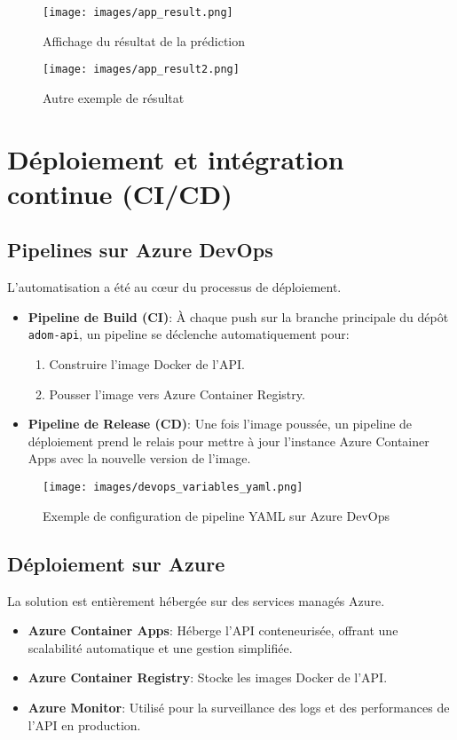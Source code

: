 \documentclass[12pt,a4paper]{report}
\begin{document}
\begin{figure}[H]
    \centering
    \begin{minipage}{0.45\textwidth}
        \centering
        \texttt{[image: images/app\_result.png]}
        \caption{Affichage du résultat de la prédiction}
    \end{minipage}\hfill
    \begin{minipage}{0.45\textwidth}
        \centering
        \texttt{[image: images/app\_result2.png]}
        \caption{Autre exemple de résultat}
    \end{minipage}
\end{figure}

\section{Déploiement et intégration continue (CI/CD)}

\subsection{Pipelines sur Azure DevOps}
L’automatisation a été au cœur du processus de déploiement.
\begin{itemize}
    \item \textbf{Pipeline de Build (CI)}: À chaque push sur la branche principale du dépôt \texttt{adom-api}, un pipeline se déclenche automatiquement pour:
        \begin{enumerate}
            \item Construire l’image Docker de l’API.\@
            \item Pousser l’image vers Azure Container Registry.
        \end{enumerate}
    \item \textbf{Pipeline de Release (CD)}: Une fois l’image poussée, un pipeline de déploiement prend le relais pour mettre à jour l’instance Azure Container Apps avec la nouvelle version de l’image.
\end{itemize}

\begin{figure}[H]
    \centering
    \texttt{[image: images/devops\_variables\_yaml.png]}
    \caption{Exemple de configuration de pipeline YAML sur Azure DevOps}
\end{figure}

\subsection{Déploiement sur Azure}
La solution est entièrement hébergée sur des services managés Azure.
\begin{itemize}
    \item \textbf{Azure Container Apps}: Héberge l’API conteneurisée, offrant une scalabilité automatique et une gestion simplifiée.
    \item \textbf{Azure Container Registry}: Stocke les images Docker de l’API.\@
    \item \textbf{Azure Monitor}: Utilisé pour la surveillance des logs et des performances de l’API en production.
\end{itemize}
\end{document}
